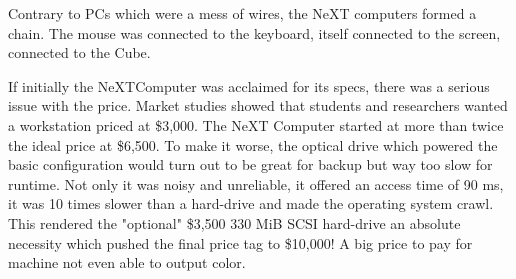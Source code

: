 Contrary to PCs which were a mess of wires, the NeXT computers formed a chain. The mouse was connected to the keyboard, itself connected to the screen, connected to the Cube.\\


\par


If initially the NeXTComputer was acclaimed for its specs, there was a serious issue with the price. Market studies showed that students and researchers wanted a workstation priced at \$3,000. The NeXT Computer started at more than twice the ideal price at \$6,500. To make it worse, the optical drive which powered the basic configuration would turn out to be great for backup but way too slow for runtime. Not only it was noisy and unreliable, it offered an access time of 90 ms, it was 10 times slower than a hard-drive and made the operating system crawl. This rendered the "optional" \$3,500 330 MiB SCSI hard-drive an absolute necessity which pushed the final price tag to \$10,000! A big price to pay for machine not even able to output color.\\
\par




